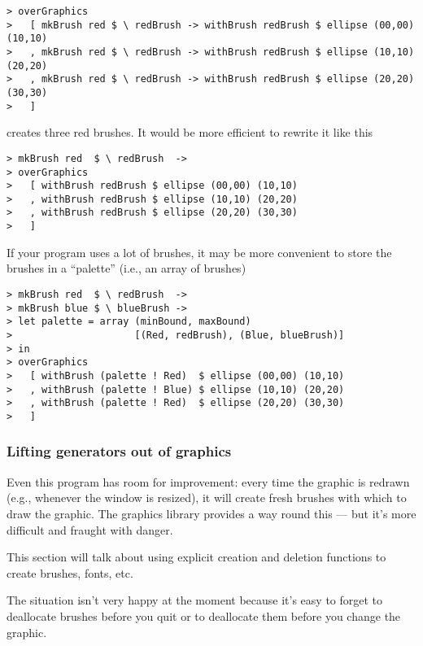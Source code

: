 \begin{verbatim}
> overGraphics
>   [ mkBrush red $ \ redBrush -> withBrush redBrush $ ellipse (00,00) (10,10)
>   , mkBrush red $ \ redBrush -> withBrush redBrush $ ellipse (10,10) (20,20)
>   , mkBrush red $ \ redBrush -> withBrush redBrush $ ellipse (20,20) (30,30)
>   ]
\end{verbatim}

creates three red brushes.  It would be more efficient to rewrite it 
like this

\begin{verbatim}
> mkBrush red  $ \ redBrush  ->
> overGraphics
>   [ withBrush redBrush $ ellipse (00,00) (10,10)
>   , withBrush redBrush $ ellipse (10,10) (20,20)
>   , withBrush redBrush $ ellipse (20,20) (30,30)
>   ]
\end{verbatim}

If your program uses a lot of brushes, it may be more convenient to
store the brushes in a ``palette'' (i.e., an array of brushes)

\begin{verbatim}
> mkBrush red  $ \ redBrush  ->
> mkBrush blue $ \ blueBrush ->
> let palette = array (minBound, maxBound) 
>                     [(Red, redBrush), (Blue, blueBrush)]
> in
> overGraphics
>   [ withBrush (palette ! Red)  $ ellipse (00,00) (10,10)
>   , withBrush (palette ! Blue) $ ellipse (10,10) (20,20)
>   , withBrush (palette ! Red)  $ ellipse (20,20) (30,30)
>   ]
\end{verbatim}


\subsubsection{Lifting generators out of graphics}


Even this program has room for improvement: every time the graphic is
redrawn (e.g., whenever the window is resized), it will create fresh
brushes with which to draw the graphic.  The graphics library provides
a way round this --- but it's more difficult and fraught with danger.

\begin{outline}
This section will talk about using explicit creation and deletion
functions to create brushes, fonts, etc.

The situation isn't very happy at the moment because it's easy to
forget to deallocate brushes before you quit or to deallocate them
before you change the graphic.  


\end{outline}



